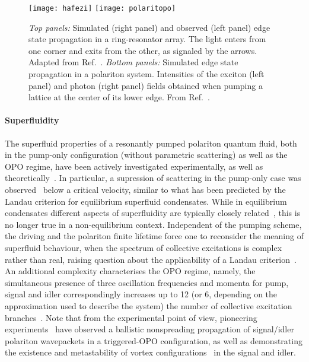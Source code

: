 %
\begin{figure}[tb]\centering
  \texttt{[image: hafezi]}
  \texttt{[image: polaritopo]}
  \caption{
    \emph{Top panels:} Simulated (right panel) and observed (left panel)
    edge state propagation in a ring-resonator array.  The light enters
    from one corner and exits from the other, as signaled by the
    arrows. Adapted from Ref.~\cite{hafezi2013imaging}.  \emph{Bottom
      panels:} Simulated edge state propagation in a polariton system.
    Intensities of the exciton (left panel) and photon (right panel)
    fields obtained when pumping a lattice at the center of its lower
    edge. From Ref.~\cite{PhysRevX.5.031001}.
  }\label{fig:topolariton}
\end{figure}
%
\paragraph{Superfluidity}
The superfluid properties of a resonantly pumped polariton quantum
fluid, both in the pump-only configuration (without parametric
scattering) as well as the OPO regime, have been actively investigated
experimentally, as well as theoretically~\cite{Carusotto_2013}. In
particular, a supression of scattering in the pump-only case was
observed~\cite{Amo_2009} below a critical velocity, similar to what
has been predicted by the Landau criterion for equilibrium superfluid
condensates.
%
While in equilibrium condensates different aspects of superfluidity
are typically closely related~\cite{Leggett_1999}, this is no longer
true in a non-equilibrium context.  Independent of the pumping scheme,
the driving and the polariton finite lifetime force one to reconsider
the meaning of superfluid behaviour, when the spectrum of collective
excitations is complex rather than real, raising question about the
applicability of a Landau criterion~\cite{Wouters_2010}.
%
An additional complexity characterises the OPO regime, namely, the
simultaneous presence of three oscillation frequencies and momenta for
pump, signal and idler correspondingly increases up to 12 (or 6,
depending on the approximation used to describe the system) the number
of collective excitation branches~\cite{Wouters_2007}. Note that from
the experimental point of view, pioneering
experiments~\cite{Amo_2009_b} have observed a ballistic nonspreading
propagation of signal/idler polariton wavepackets in a triggered-OPO
configuration, as well as demonstrating the existence and
metastability of vortex configurations~\cite{Sanvitto_2010} in the
signal and idler.
 

